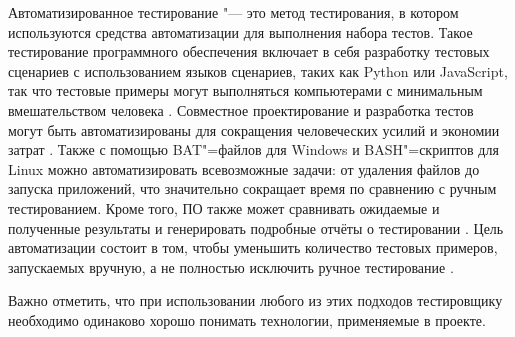 Автоматизированное тестирование "--- это метод тестирования, в котором 
используются средства автоматизации для выполнения набора тестов. Такое 
тестирование программного обеспечения включает в себя разработку тестовых 
сценариев с использованием языков сценариев, таких как Python или JavaScript, 
так что тестовые примеры могут выполняться компьютерами с минимальным 
вмешательством человека \cite{Sharm}. Совместное проектирование и 
разработка тестов могут быть автоматизированы для сокращения человеческих усилий 
и экономии затрат \cite{Krya}. Также с помощью BAT"=файлов для 
Windows и BASH"=скриптов для Linux можно автоматизировать всевозможные задачи: 
от удаления файлов до запуска приложений, что значительно сокращает время по 
сравнению с ручным тестированием. Кроме того, ПО также может сравнивать 
ожидаемые и полученные результаты и генерировать подробные отчёты о тестировании
\cite{Bugaenko}. Цель автоматизации состоит в том, чтобы 
уменьшить количество тестовых примеров, запускаемых вручную, а не полностью 
исключить ручное тестирование \cite{Dustin}.

Важно отметить, что при использовании любого из этих подходов тестировщику 
необходимо одинаково хорошо понимать технологии, применяемые в проекте.
 
